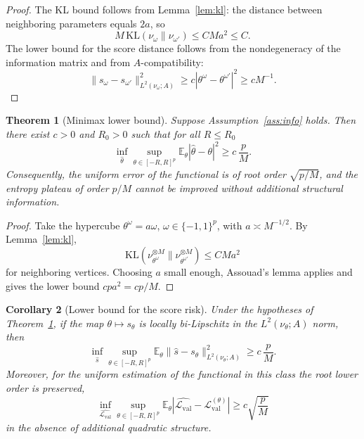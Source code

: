 \documentclass{article}
\newtheorem{theorem}{Theorem}[section]
\newtheorem{corollary}[theorem]{Corollary}
\newcommand{\E}{\mathbb E}
\newcommand{\Eval}{\mathcal L_{\mathrm{val}}}
\begin{document}
\begin{proof}
The KL bound follows from Lemma~\ref{lem:kl}: the distance between neighboring
parameters equals \(2a\), so
\[
        M\,\mathrm{KL}(\nu_\omega\|\nu_{\omega'})
        \le CMa^2\le C.
\]
The lower bound for the score distance follows from the nondegeneracy of the
information matrix and from \(A\)-compatibility:
\[
        \|s_\omega-s_{\omega'}\|_{L^2(\nu_\omega;A)}^2
        \ge c|\theta^\omega-\theta^{\omega'}|^2
        \ge cM^{-1}.
\]
\end{proof}


\begin{theorem}[Minimax lower bound]
\label{thm:minimax}
Suppose Assumption~\ref{ass:info} holds. Then there exist \(c>0\) and \(R_0>0\)
such that for all \(R\le R_0\)
\[
        \inf_{\widehat\theta}
        \sup_{\theta\in[-R,R]^p}
        \E_\theta|\widehat\theta-\theta|^2
        \ge
        c\,\frac{p}{M}.
\]
Consequently, the uniform error of the functional is of root order
\(\sqrt{p/M}\), and the entropy plateau of order \(p/M\) cannot be improved
without additional structural information.
\end{theorem}

\begin{proof}
Take the hypercube \(\theta^\omega=a\omega\), \(\omega\in\{-1,1\}^p\), with
\(a\asymp M^{-1/2}\). By Lemma~\ref{lem:kl},
\[
        \mathrm{KL}(\nu_{\theta^\omega}^{\otimes M}\|
        \nu_{\theta^{\omega'}}^{\otimes M})
        \le CMa^2
\]
for neighboring vertices. Choosing \(a\) small enough, Assouad's lemma
\cite{Wainwright} applies and gives the lower bound \(cp a^2=cp/M\).
\end{proof}

\begin{corollary}[Lower bound for the score risk]
\label{cor:minimax-score-risk}
Under the hypotheses of Theorem~\ref{thm:minimax}, if the map
\(\theta\mapsto s_\theta\) is locally bi-Lipschitz in the \(L^2(\nu_\theta;A)\)
norm, then
\[
        \inf_{\widehat s}
        \sup_{\theta\in[-R,R]^p}
        \mathbb E_\theta
        \|\widehat s-s_\theta\|_{L^2(\nu_\theta;A)}^2
        \ge c\,\frac{p}{M}.
\]
Moreover, for the uniform estimation of the functional in this class the root
lower order is preserved,
\[
        \inf_{\widehat{\Eval}}
        \sup_{\theta\in[-R,R]^p}
        \mathbb E_\theta|\widehat{\Eval}-\mathcal L_{\mathrm{val}}^{(\theta)}|
        \ge c\sqrt{\frac pM}
\]
in the absence of additional quadratic structure.
\end{corollary}
\end{document}
